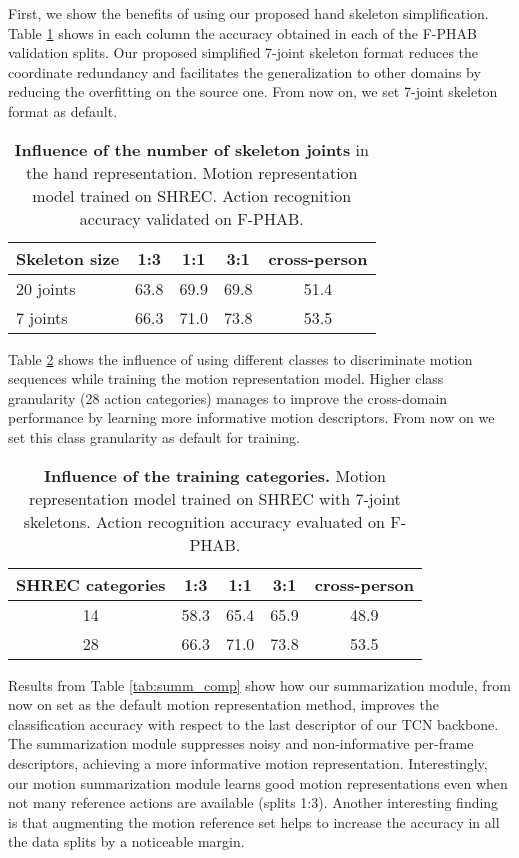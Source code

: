 \documentclass[letterpaper, 10 pt, conference]{ieeeconf}
\begin{document}
First, we show the benefits of using our proposed hand skeleton simplification. 
Table \ref{tab:skel_size} shows in each column the accuracy obtained in each of the F-PHAB validation splits.
Our proposed simplified 7-joint skeleton format reduces the coordinate redundancy and facilitates the generalization to other domains by reducing the overfitting on the source one. From now on, we set 7-joint skeleton format as default.

\begin{table}[!htb]
\centering
\begin{tabular}{|l|c|c|c|c|}
\hline
\textbf{Skeleton size} & \textbf{1:3} & \textbf{1:1} & \textbf{3:1} & \textbf{cross-person} \\ \hline
20 joints & 63.8 & 69.9 & 69.8 & 51.4 \\ \hline
7 joints & 66.3 & 71.0 & 73.8 & 53.5 \\ \hline
\end{tabular}
\caption{\textbf{Influence of the number of skeleton joints} in the hand representation. Motion representation model trained on SHREC. Action recognition accuracy validated on F-PHAB. }
\label{tab:skel_size}
\end{table}



Table \ref{tab:train_labels} shows the influence of using different classes to discriminate motion sequences while training the motion representation model.
Higher class granularity (28 action categories) manages to improve the cross-domain performance by learning more informative motion descriptors. From now on we set this class granularity as default for training.

\begin{table}[!htb]
\centering
\begin{tabular}{|c|c|c|c|c|}
\hline
\textbf{SHREC categories} & \textbf{1:3} & \textbf{1:1} & \textbf{3:1} & \textbf{cross-person} \\ \hline
14 & 58.3 & 65.4 & 65.9 & 48.9 \\ \hline
28 & 66.3 & 71.0 & 73.8 & 53.5 \\ \hline
\end{tabular}
\caption{\textbf{Influence of the training categories.} Motion representation model trained on SHREC with 7-joint skeletons. Action recognition accuracy evaluated on F-PHAB.}
\label{tab:train_labels}
\end{table}



Results from Table \ref{tab:summ_comp} show how our summarization module, from now on set as the default motion representation method, improves the classification accuracy with respect to the last descriptor of our TCN backbone. The summarization module suppresses noisy and non-informative per-frame descriptors, achieving a more informative motion representation. Interestingly, our motion summarization module learns good motion representations even when not many reference actions are available (splits 1:3). Another interesting finding is that augmenting the motion reference set helps to increase the accuracy in all the data splits by a noticeable margin.
\end{document}
